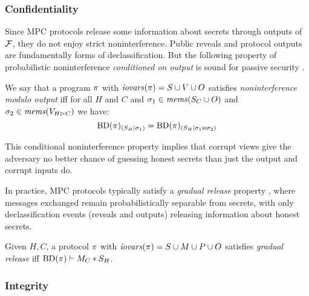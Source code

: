 \subsubsection{Confidentiality}

Since MPC protocols release some information about secrets through
outputs of $\mathcal{F}$, they do not enjoy strict noninterference.
Public reveals and protocol outputs are fundamentally forms of
declassification. But the following property of probabilistic
noninterference \emph{conditioned on output} is sound for passive
security \cite{skalka-near-ppdp24}.
\begin{definition}
  \label{definition-NIMO}
  We say that a program $\pi$ with $\mathit{iovars}(\pi) = S \cup V \cup O$
  satisfies \emph{noninterference modulo output}
  iff for all $H$ and $C$ and $\sigma_1 \in \mathit{mems}(S_C \cup O)$ and $\sigma_2 \in \mathit{mems}(V_{H \rhd C})$
  we have:
  $$
  \mathrm{BD}(\pi)_{({S_H}|{\sigma_1})} = \mathrm{BD}(\pi)_{({S_H}|{\sigma_1 \uplus \sigma_2})}
 $$
\end{definition}
This conditional noninterference property implies that
corrupt views give the adversary no better chance of guessing honest
secrets than just the output and corrupt inputs do.

In practice, MPC protocols typically satisfy a \emph{gradual
release} property \cite{sabelfeld2009declassification}, where messages
exchanged remain probabilistically separable from secrets, with only
declassification events (reveals and outputs) releasing information
about honest secrets.  
\begin{definition}
  Given $H,C$, a protocol $\pi$ with $\mathit{iovars}(\pi) = S \cup M \cup P \cup O$
  satisfies \emph{gradual release} iff
  $\mathrm{BD}(\pi) \vdash M_C * S_H$.
\end{definition}

\subsubsection{Integrity}

